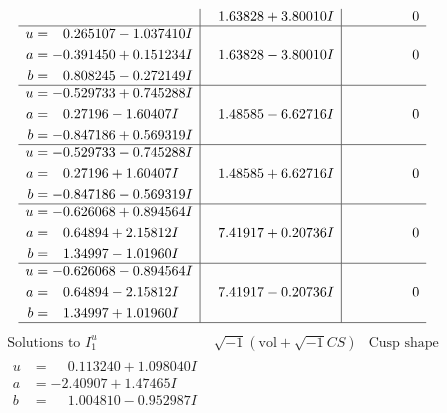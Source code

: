 \documentclass[1p]{elsarticle_modified}
\theoremstyle{definition}
\newcommand{\I}{\sqrt{-1}}
\begin{document}
$$\begin{array}{c|c|c}
 & \phantom{-}1.63828 + 3.80010 I & \phantom{-0.000000 } 0 \\ \hline\begin{aligned}
u &= \phantom{-}0.265107 - 1.037410 I \\
a &= -0.391450 + 0.151234 I \\
b &= \phantom{-}0.808245 - 0.272149 I\end{aligned}
 & \phantom{-}1.63828 - 3.80010 I & \phantom{-0.000000 } 0 \\ \hline\begin{aligned}
u &= -0.529733 + 0.745288 I \\
a &= \phantom{-}0.27196 - 1.60407 I \\
b &= -0.847186 + 0.569319 I\end{aligned}
 & \phantom{-}1.48585 - 6.62716 I & \phantom{-0.000000 } 0 \\ \hline\begin{aligned}
u &= -0.529733 - 0.745288 I \\
a &= \phantom{-}0.27196 + 1.60407 I \\
b &= -0.847186 - 0.569319 I\end{aligned}
 & \phantom{-}1.48585 + 6.62716 I & \phantom{-0.000000 } 0 \\ \hline\begin{aligned}
u &= -0.626068 + 0.894564 I \\
a &= \phantom{-}0.64894 + 2.15812 I \\
b &= \phantom{-}1.34997 - 1.01960 I\end{aligned}
 & \phantom{-}7.41917 + 0.20736 I & \phantom{-0.000000 } 0 \\ \hline\begin{aligned}
u &= -0.626068 - 0.894564 I \\
a &= \phantom{-}0.64894 - 2.15812 I \\
b &= \phantom{-}1.34997 + 1.01960 I\end{aligned}
 & \phantom{-}7.41917 - 0.20736 I & \phantom{-0.000000 } 0\\
 \hline 
 \end{array}$$\newpage$$\begin{array}{c|c|c}  
\text{Solutions to }I^u_{1}& \I (\text{vol} + \sqrt{-1}CS) & \text{Cusp shape}\\
 \hline 
\begin{aligned}
u &= \phantom{-}0.113240 + 1.098040 I \\
a &= -2.40907 + 1.47465 I \\
b &= \phantom{-}1.004810 - 0.952987 I\end{aligned}

\end{array}$$
\end{document}
